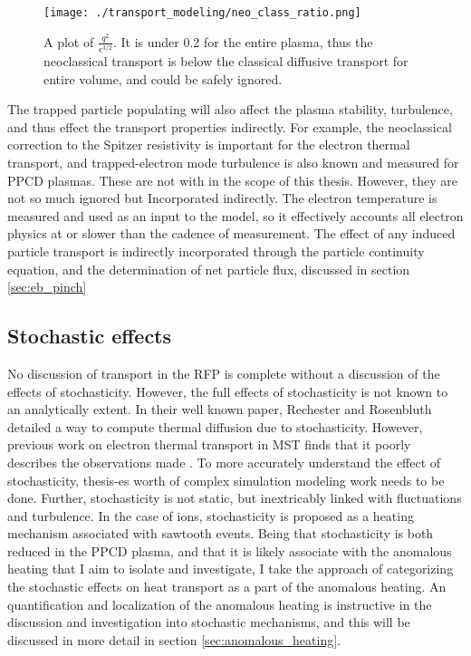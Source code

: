 \begin{refsection}
\begin{figure}[!htb]
	\centering
	\texttt{[image: ./transport\_modeling/neo\_class\_ratio.png]}
    \caption[$\frac{q^2}{\epsilon^{3/2}}$ in PPCD]{A plot of $\frac{q^2}{\epsilon^{3/2}}$. It is under 0.2 for the entire plasma, thus the neoclassical transport is below the classical diffusive transport for entire volume, and could be safely ignored.}
\end{figure}%

The trapped particle populating will also affect the plasma stability, turbulence, and thus effect the transport properties indirectly. For example, the neoclassical correction to the Spitzer resistivity is important for the electron thermal transport, and trapped-electron mode turbulence is also known and measured for PPCD plasmas. These are not with in the scope of this thesis. However, they are not so much ignored but Incorporated indirectly. The electron temperature is measured and used as an input to the model, so it effectively accounts all electron physics at or slower than the cadence of measurement. The effect of any induced particle transport is indirectly incorporated through the particle continuity equation, and the determination of net particle flux, discussed in section \ref{sec:eb_pinch}

\subsection{Stochastic effects}\label{sec:stochastic_effects}
No discussion of transport in the RFP is complete without a discussion of the effects of stochasticity. However, the full effects of stochasticity is not known to an analytically extent. In their well known paper, Rechester and Rosenbluth\cite{Rechester1978} detailed a way to compute thermal diffusion due to stochasticity. However, previous work on electron thermal transport in MST finds that it poorly describes the observations made \cite{Reusch2011}. To more accurately understand the effect of stochasticity, thesis-es worth of complex simulation modeling work needs to be done. Further, stochasticity is not static, but inextricably linked with fluctuations and turbulence. In the case of ions, stochasticity is proposed as a heating mechanism associated with sawtooth events\cite{Fiksel2009}. Being that stochasticity is both reduced in the PPCD plasma, and that it is likely associate with the anomalous heating that I aim to isolate and investigate, I take the approach of categorizing the stochastic effects on heat transport as a part of the anomalous heating. An quantification and localization of the anomalous heating is instructive in the discussion and investigation into stochastic mechanisms, and this will be discussed in more detail in section \ref{sec:anomalous_heating}.


\end{refsection}
